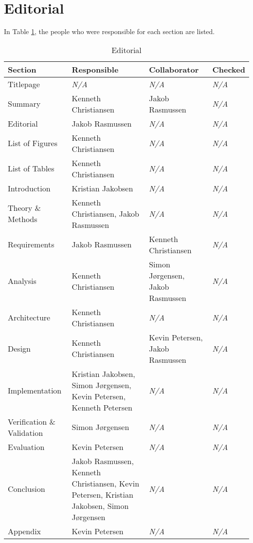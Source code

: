 \section{Editorial}
In Table \ref{table:editorial}, the people who were responsible for each section
are listed.
\begin{table}[ht]
    \begin{tabularx}{\textwidth}{|>{\RaggedRight}X|>{\RaggedRight}X|>{\RaggedRight}X|>{\RaggedRight}X|}
        \hline
        \textbf{Section} & \textbf{Responsible} & \textbf{Collaborator} & \textbf{Checked}\\
        \hline
        Titlepage & \textit{N/A} & \textit{N/A} & \textit{N/A}\\
        \hline
        Summary & Kenneth Christiansen & Jakob Rasmussen & \textit{N/A}\\
        \hline
        Editorial & Jakob Rasmussen & \textit{N/A} & \textit{N/A}\\
        \hline
        List of Figures & Kenneth Christiansen & \textit{N/A} & \textit{N/A}\\
        \hline
        List of Tables & Kenneth Christiansen & \textit{N/A} & \textit{N/A}\\
        \hline
        Introduction & Kristian Jakobsen & \textit{N/A} & \textit{N/A}\\
        \hline
        Theory \& Methods & Kenneth Christiansen, Jakob Rasmussen & \textit{N/A} & \textit{N/A}\\
        \hline
        Requirements & Jakob Rasmussen & Kenneth Christiansen & \textit{N/A}\\
        \hline
        Analysis & Kenneth Christiansen & Simon Jørgensen, Jakob Rasmussen & \textit{N/A}\\
        \hline
        Architecture & Kenneth Christiansen & \textit{N/A} & \textit{N/A}\\
        \hline
        Design & Kenneth Christiansen & Kevin Petersen, Jakob Rasmussen & \textit{N/A}\\
        \hline
        Implementation & Kristian Jakobsen, Simon Jørgensen, Kevin Petersen, Kenneth Petersen & \textit{N/A} & \textit{N/A}\\
        \hline
        Verification \& Validation & Simon Jørgensen & \textit{N/A} & \textit{N/A}\\
        \hline
        Evaluation & Kevin Petersen & \textit{N/A} & \textit{N/A}\\
        \hline
        Conclusion & Jakob Rasmussen, Kenneth Christiansen, Kevin Petersen, Kristian Jakobsen, Simon Jørgensen & \textit{N/A} & \textit{N/A}\\
        \hline
        Appendix & Kevin Petersen & \textit{N/A} & \textit{N/A}\\
        \hline
    \end{tabularx}
    \caption{Editorial} 
    \label{table:editorial}
\end{table} 